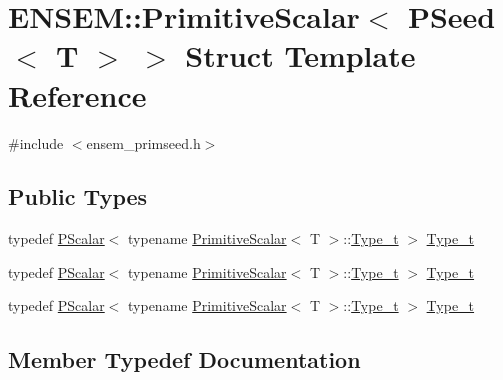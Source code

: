 \hypertarget{structENSEM_1_1PrimitiveScalar_3_01PSeed_3_01T_01_4_01_4}{}\section{E\+N\+S\+EM\+:\+:Primitive\+Scalar$<$ P\+Seed$<$ T $>$ $>$ Struct Template Reference}
\label{structENSEM_1_1PrimitiveScalar_3_01PSeed_3_01T_01_4_01_4}


{\ttfamily \#include $<$ensem\+\_\+primseed.\+h$>$}

\subsection*{Public Types}
\begin{DoxyCompactItemize}
\item 
typedef \mbox{\hyperlink{classENSEM_1_1PScalar}{P\+Scalar}}$<$ typename \mbox{\hyperlink{structENSEM_1_1PrimitiveScalar}{Primitive\+Scalar}}$<$ T $>$\+::\mbox{\hyperlink{structENSEM_1_1PrimitiveScalar_3_01PSeed_3_01T_01_4_01_4_a222ab5cf9af822b8b516473da4b5a787}{Type\+\_\+t}} $>$ \mbox{\hyperlink{structENSEM_1_1PrimitiveScalar_3_01PSeed_3_01T_01_4_01_4_a222ab5cf9af822b8b516473da4b5a787}{Type\+\_\+t}}
\item 
typedef \mbox{\hyperlink{classENSEM_1_1PScalar}{P\+Scalar}}$<$ typename \mbox{\hyperlink{structENSEM_1_1PrimitiveScalar}{Primitive\+Scalar}}$<$ T $>$\+::\mbox{\hyperlink{structENSEM_1_1PrimitiveScalar_3_01PSeed_3_01T_01_4_01_4_a222ab5cf9af822b8b516473da4b5a787}{Type\+\_\+t}} $>$ \mbox{\hyperlink{structENSEM_1_1PrimitiveScalar_3_01PSeed_3_01T_01_4_01_4_a222ab5cf9af822b8b516473da4b5a787}{Type\+\_\+t}}
\item 
typedef \mbox{\hyperlink{classENSEM_1_1PScalar}{P\+Scalar}}$<$ typename \mbox{\hyperlink{structENSEM_1_1PrimitiveScalar}{Primitive\+Scalar}}$<$ T $>$\+::\mbox{\hyperlink{structENSEM_1_1PrimitiveScalar_3_01PSeed_3_01T_01_4_01_4_a222ab5cf9af822b8b516473da4b5a787}{Type\+\_\+t}} $>$ \mbox{\hyperlink{structENSEM_1_1PrimitiveScalar_3_01PSeed_3_01T_01_4_01_4_a222ab5cf9af822b8b516473da4b5a787}{Type\+\_\+t}}
\end{DoxyCompactItemize}


\subsection{Member Typedef Documentation}
\mbox{\label{structENSEM_1_1PrimitiveScalar_3_01PSeed_3_01T_01_4_01_4_a222ab5cf9af822b8b516473da4b5a787}} 
